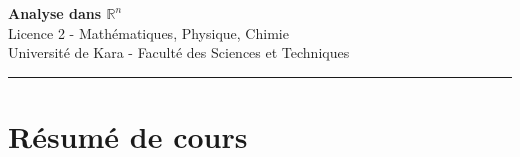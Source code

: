 \documentclass[12pt,a4paper]{article}
\begin{document}
\fi

\begin{center}
  {\LARGE\bfseries Analyse dans $\mathbb{R}^n$}\\[6pt]
  {\large Licence 2 - Mathématiques, Physique, Chimie}\\[4pt]
  {\normalsize Université de Kara - Faculté des Sciences et Techniques}
\end{center}

\vspace{8pt}
\hrule
\vspace{12pt}

\section{Résumé de cours}
\end{document}
